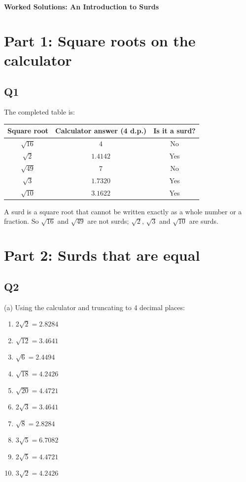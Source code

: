 \documentclass[12pt,a4paper]{article}
\begin{document}
\begin{center}
{\Large\bfseries Worked Solutions: An Introduction to Surds}
\end{center}

\section*{Part 1: Square roots on the calculator}

\subsection*{Q1}
The completed table is:

\begin{center}
\renewcommand{\arraystretch}{1.5}
\begin{tabular}{|c|c|c|}
\hline
\textbf{Square root} & \textbf{Calculator answer (4 d.p.)} & \textbf{Is it a surd?}\\
\hline
$\sqrt{16}$ & $4$ & No\\
\hline
$\sqrt{2}$ & $1.4142$ & Yes\\
\hline
$\sqrt{49}$ & $7$ & No\\
\hline
$\sqrt{3}$ & $1.7320$ & Yes\\
\hline
$\sqrt{10}$ & $3.1622$ & Yes\\
\hline
\end{tabular}
\end{center}

A surd is a square root that cannot be written exactly as a whole number or a fraction. So $\sqrt{16}$ and $\sqrt{49}$ are not surds; $\sqrt{2}$, $\sqrt{3}$ and $\sqrt{10}$ are surds.

\section*{Part 2: Surds that are equal}

\subsection*{Q2}
(a) Using the calculator and truncating to 4 decimal places:
\begin{enumerate}
\item $2\sqrt2 = 2.8284$
\item $\sqrt{12} = 3.4641$
\item $\sqrt6 = 2.4494$
\item $\sqrt{18} = 4.2426$
\item $\sqrt{20} = 4.4721$
\item $2\sqrt3 = 3.4641$
\item $\sqrt8 = 2.8284$
\item $3\sqrt5 = 6.7082$
\item $2\sqrt5 = 4.4721$
\item $3\sqrt2 = 4.2426$
\end{enumerate}
\end{document}
